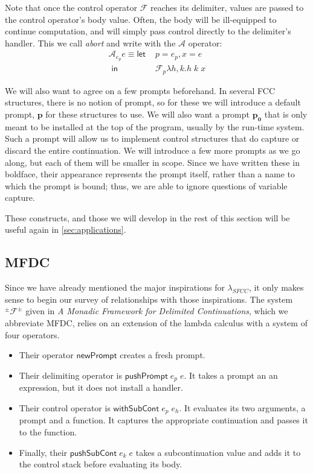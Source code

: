 \documentclass[11pt]{article}
\newcommand{\maybePage}{\newpage}
\newcommand{\letin}[2]{\textsf{let }#1\textsf{ in }#2}
\newcommand\F{\mathcal{F}}
\newcommand\A{\mathcal{A}}
\newcommand\pmFpm{^\pm\F^\pm}
\begin{document}
Note that once the control operator $\F$ reaches its delimiter, values are passed to the control operator's body value.
Often, the body will be ill-equipped to continue computation, and will simply pass control directly to the delimiter's handler.
This we call \emph{abort} and write with the $\A$ operator:
\begin{align*}
\A_{e_p}e \equiv \letin{&p = e_p, x = e\\}%
                       {&\F_{p}\lambda h,k. h\;k\;x}
\end{align*}

We will also want to agree on a few prompts beforehand.
In several FCC structures, there is no notion of prompt, so for these we will introduce a default prompt, $\mathbf{p}$ for these structures to use.
We will also want a prompt $\mathbf{p_0}$ that is only meant to be installed at the top of the program, usually by the run-time system.
Such a prompt will allow us to implement control structures that do capture or discard the entire continuation.
We will introduce a few more prompts as we go along, but each of them will be smaller in scope.
Since we have written these in boldface, their appearance represents the prompt itself, rather than a name to which the prompt is bound; thus, we are able to ignore questions of variable capture.

These constructs, and those we will develop in the rest of this section will be useful again in \ref{sec:applications}.

\maybePage
\subsection{MFDC}

Since we have already mentioned the major inspirations for $\lambda_{SFCC}$, it only makes sense to begin our survey of relationships with those inspirations.
The system $\pmFpm$ given in \textit{A Monadic Framework for Delimited Continuations}\cite{MFDC}, which we abbreviate MFDC, relies on an extension of the lambda calculus with a system of four operators.

\begin{itemize}
\item Their operator $\mathsf{newPrompt}$ creates a fresh prompt.
\item Their delimiting operator is $\mathsf{pushPrompt}\;e_p\;e$.
It takes a prompt an an expression, but it does not install a handler.
\item Their control operator is $\mathsf{withSubCont}\;e_p\;e_h$.
It evaluates its two arguments, a prompt and a function.
It captures the appropriate continuation and passes it to the function.
\item Finally, their $\mathsf{pushSubCont}\;e_k\;e$ takes a subcontinuation value and adds it to the control stack before evaluating its body.
\end{itemize}
\end{document}
